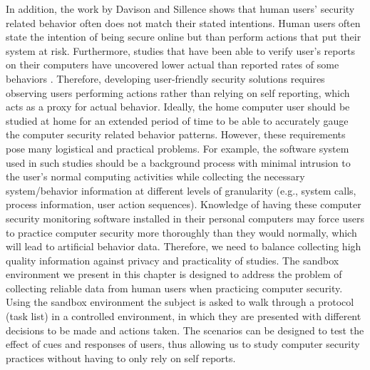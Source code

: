 In addition, the work by Davison and Sillence \cite{davinson2010} shows that human users' security related behavior often does not match their stated intentions. 
Human users often state the intention of being secure online but than perform actions that put their system at risk. 
Furthermore, studies that have been able to verify user's reports on their computers have uncovered lower actual than reported rates of some behaviors \cite{govani2005, national2010}. 
Therefore, developing user-friendly security solutions requires observing users performing actions rather than relying on self reporting, which acts as a proxy for actual behavior. Ideally, the home computer user should be studied at home for an extended period of time to be able to accurately gauge the computer security related behavior patterns. 
However, these requirements pose many logistical and practical problems. 
For example, the software system used in such studies should be a background process with minimal intrusion to the user's normal computing activities while collecting the necessary system/behavior information at different levels of granularity (e.g., system calls, process information, user action sequences). 
Knowledge of having these computer security monitoring software installed in their personal computers may force users to practice computer security more thoroughly than they would normally, which will lead to artificial behavior data.  
Therefore, we need to balance collecting high quality information against privacy and practicality of studies. 
The sandbox environment  we present in this chapter is designed to address the problem of collecting reliable data from human users when practicing computer security. 
Using the sandbox environment the subject is asked to walk through a protocol (task list) in a controlled environment, in which they are presented with different decisions to be made and actions taken. 
The scenarios can be designed to test the effect of cues and responses of users, thus allowing us to study computer security practices without having to only rely on self reports. 



